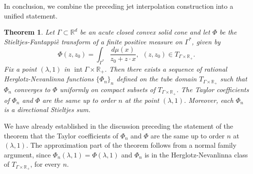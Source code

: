 \documentclass[11pt,reqno]{amsart}
\theoremstyle{plain}
\newtheorem{theorem}{Theorem}[section]
\theoremstyle{definition}
\numberwithin{equation}{section}
\begin{document}
	In conclusion, we combine the preceding jet interpolation construction into a unified statement.
	\begin{theorem} \label{Thm:S-F-approximation}
    Let $\Gamma \subset {\mathbb R}^d$ be an acute closed convex solid cone and let $\Phi$ be the Stieltjes-Fantappi\`e transform of a finite positive measure on $\Gamma^*$, given by
    $$
    \Phi(z, z_0) = \int_{\Gamma^*} \frac{d\mu(x)}{z_0 + z\cdot x}, \ \ (z, z_0) \in T_{\Gamma \times \mathbb{R}_+}.
    $$
    Fix a point $(\lambda, 1)$ in $\operatorname{int} \Gamma \times \mathbb{R}_+$. Then there exists a sequence of rational Herglotz-Nevanlinna functions $\{ \Phi_n \}_n$ defined on the tube domain $T_{\Gamma \times \mathbb{R}_+}$ such that $\Phi_n$ converges to $\Phi$ uniformly on compact subsets of $T_{\Gamma \times \mathbb{R}_+}$. 
        The Taylor coefficients of $\Phi_n$ and $\Phi$ are the same up to order $n$ at the point $(\lambda, 1)$. Moreover, each $\Phi_n$ is a directional Stieltjes sum.
	\end{theorem}

		We have already established in the discussion preceding the statement of the theorem that the Taylor coefficients of $\Phi_n$ and $\Phi$ are the same up to order $n$ at $(\lambda, 1)$. The approximation part of the theorem follows from a normal family argument, since $\Phi_n(\lambda, 1)=\Phi(\lambda, 1)$ and $\Phi_n$ is in the Herglotz-Nevanlinna class of $T_{\Gamma \times \mathbb{R}_+}$, for every $n$. 
\end{document}
